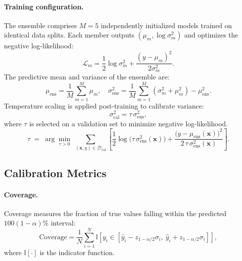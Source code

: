 \documentclass{article}
\begin{document}
\paragraph{Training configuration.}
The ensemble comprises $M=5$ independently initialized models trained on identical data splits. 
Each member outputs $(\mu_m, \log\sigma_m^2)$ and optimizes the negative log-likelihood:
\begin{equation}
\mathcal{L}_m=\frac{1}{2}\log\sigma_m^2+\frac{(y-\mu_m)^2}{2\sigma_m^2}.
\end{equation}
The predictive mean and variance of the ensemble are:
\begin{equation}
\mu_{\mathrm{ens}}=\frac{1}{M}\sum_{m=1}^M \mu_m,\quad
\sigma_{\mathrm{ens}}^2=\frac{1}{M}\sum_{m=1}^M (\sigma_m^2+\mu_m^2) - \mu_{\mathrm{ens}}^2.
\end{equation}
Temperature scaling is applied post-training to calibrate variance:
\begin{equation}
\sigma_{\mathrm{cal}}^2 = \tau \,\sigma_{\mathrm{ens}}^2,
\end{equation}
where $\tau$ is selected on a validation set to minimize negative log-likelihood.
\begin{equation}
\tau \;=\; \arg\min_{\tau>0}\; 
\sum_{(\mathbf{x},y)\in \mathcal{D}_{\mathrm{val}}}
\left[
\frac{1}{2}\log \big(\tau\,\sigma_{\mathrm{ens}}^2(\mathbf{x})\big) +
\frac{\big(y-\mu_{\mathrm{ens}}(\mathbf{x})\big)^2}{2\,\tau\,\sigma_{\mathrm{ens}}^2(\mathbf{x})}
\right].
\label{eq:temp-scale}
\end{equation}

\subsection{Calibration Metrics}
\label{sec:calibration-metrics}

\paragraph{Coverage.}
Coverage measures the fraction of true values falling within the predicted $100(1-\alpha)\%$ interval:
\begin{equation}
\label{eq:coverage}
\mathrm{Coverage} = \frac{1}{N} \sum_{i=1}^N \mathbb{I} \left[ y_i \in \left[ \hat{y}_i - z_{1-\alpha/2} \sigma_i,\ \hat{y}_i + z_{1-\alpha/2} \sigma_i \right] \right],
\end{equation}
where $\mathbb{I}[\cdot]$ is the indicator function.
\end{document}
